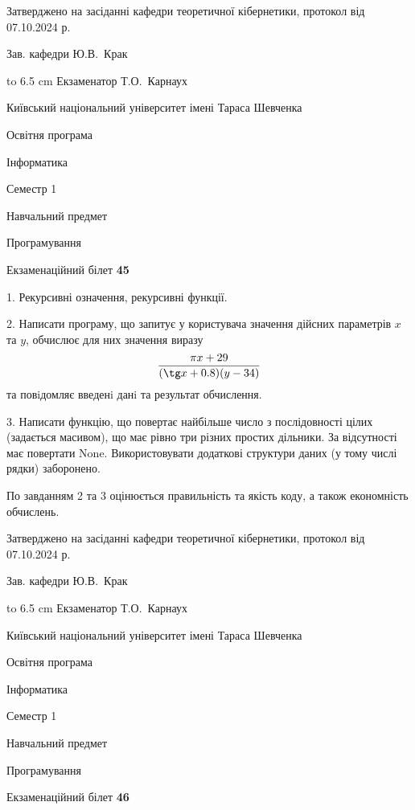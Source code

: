 \documentclass[12pt, ukrainian]{article}
\begin{document}
{\smallskip\smallskip \begin {scriptsize} Затверджено на засіданні кафедри теоретичної кібернетики, протокол   від   07.10.2024 р.\par\smallskip\smallskip\smallskip\smallskip
{\parbox {6.5 cm} {Зав. кафедри \dotfill Ю.В.~Крак}}\hspace {0.7cm} {\hbox to 6.5 cm { Екзаменатор \dotfill Т.О.~Карнаух}} \end{scriptsize}}
\vspace{0.9cm}
{{\begin {scriptsize}\par
{ \center  Київський національний університет імені Тараса Шевченка \par}
{\parbox {5 cm}{Освітня програма \hfill}{\parbox {7 cm}{Інформатика\hfill}}\parbox {6 cm}{\hfill Семестр 1}}\par
{\parbox {5 cm} {Навчальний предмет \hfill}\parbox {7 cm}{Програмування \hfill}\parbox {6cm}{\hfill}\par}\vspace{-15pt} \end{scriptsize}}{\center Екзаменаційний білет \No \textbf { 45 }\par}}
{%
1. Рекурсивні означення, рекурсивні функції.%
\par
2. Написати програму, що запитує у користувача значення дійсних параметрів $x$ та $y$, обчислює для них значення виразу 
$$\frac{\pi x + 29}{(\tg x + 0.8) (y - 34)}$$ 
та повiдомляє введенi данi та результат обчислення.

\par
3. Написати функцію, що повертає найбільше число з послідовності цілих (задається масивом), що має рівно три різних простих дільники. За відсутності має повертати None. Використовувати додаткові структури даних (у тому числі рядки) заборонено.

По завданням 2 та 3 оцінюється правильність та якість коду, а також економність обчислень.

}
{\smallskip\smallskip \begin {scriptsize} Затверджено на засіданні кафедри теоретичної кібернетики, протокол   від   07.10.2024 р.\par\smallskip\smallskip\smallskip\smallskip
{\parbox {6.5 cm} {Зав. кафедри \dotfill Ю.В.~Крак}}\hspace {0.7cm} {\hbox to 6.5 cm { Екзаменатор \dotfill Т.О.~Карнаух}} \end{scriptsize}}
\newpage
{{\begin {scriptsize}\par
{ \center  Київський національний університет імені Тараса Шевченка \par}
{\parbox {5 cm}{Освітня програма \hfill}{\parbox {7 cm}{Інформатика\hfill}}\parbox {6 cm}{\hfill Семестр 1}}\par
{\parbox {5 cm} {Навчальний предмет \hfill}\parbox {7 cm}{Програмування \hfill}\parbox {6cm}{\hfill}\par}\vspace{-15pt} \end{scriptsize}}{\center Екзаменаційний білет \No \textbf { 46 }\par}}
\end{document}
